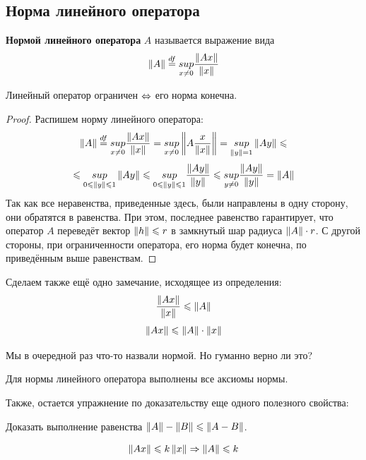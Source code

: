 \documentclass[12pt]{article}
\begin{document}
	\subsection{Норма линейного оператора}
	
	\begin{defi}
		\textbf{Нормой линейного оператора} $A$ называется выражение вида 
		$$\left\| A \right\| \overset{df}{=} \underset{x \neq 0}{sup} \frac{\left\| Ax \right\|}{\left\| x \right\|}$$
	\end{defi}
	
	\begin{state}
		Линейный оператор ограничен $\Leftrightarrow$ его норма конечна.
	\end{state}
	\begin{proof}
		Распишем норму линейного оператора:
		$$
			\left\| A \right\| \overset{df}{=} \underset{x \neq 0}{sup} \frac{\left\| Ax \right\|}{\left\| x \right\|} = 
			\underset{x \neq 0}{sup} \left\| A \frac{x}{\left\| x \right\|} \right\| =
			\underset{\left\| y \right\| = 1}{sup} \left\| Ay \right\| \leqslant
		$$
		$$
			\leqslant
			\underset{0 \leqslant \left\| y \right\| \leqslant 1}{sup} \left\| Ay \right\| \leqslant
			\underset{0 \leqslant \left\| y \right\| \leqslant 1}{sup} \frac{\left\| Ay \right\|}{\left\| y \right\|} \leqslant
			\underset{y \neq 0}{sup} \frac{\left\| Ay \right\|}{\left\| y \right\|} =
			\left\| A \right\|
		$$
		Так как все неравенства, приведенные здесь, были направлены в одну сторону,
		они обратятся в равенства. При этом, последнее равенство гарантирует, что
		оператор $A$ переведёт вектор $\left\| h \right\| \leqslant r$ в замкнутый шар радиуса $\left\| A \right\| \cdot r$.
		С другой стороны, при ограниченности оператора, его норма будет конечна, по приведённым
		выше равенствам.
	\end{proof}
	
	Сделаем также ещё одно замечание, исходящее из определения:
	$$ \frac{\left\| Ax \right\|}{\left\| x \right\|} \leqslant \left\| A \right\| $$
	$$ \left\| Ax \right\| \leqslant \left\| A \right\| \cdot \left\| x \right\| $$
	
	Мы в очередной раз что-то назвали нормой. Но {\color{gray}гуманно} верно ли это?
	
	\exc Для нормы линейного оператора выполнены все аксиомы нормы.
	
	Также, остается упражнение по доказательству еще одного полезного свойства:
	
	\exc Доказать выполнение равенства $\left\| A \right\| - \left\| B \right\| \leqslant \left\| A-B \right\|$.
	
	\begin{state}
		$$\left\| Ax \right\| \leqslant k \left\| x \right\| \Rightarrow \left\| A \right\| \leqslant k$$
	\end{state}
	
\end{document}
